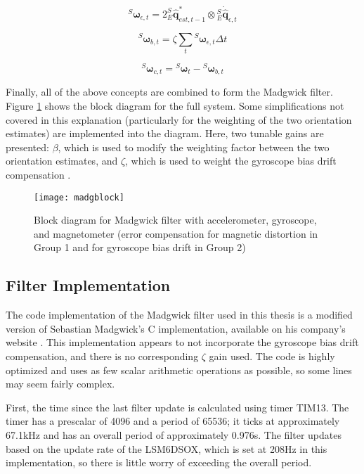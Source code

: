 \documentclass[12pt,a4paper]{report}
\begin{document}
\begin{equation} \label{eq:gy1}
	{}^S\boldsymbol{\omega}_{\epsilon,t} = 2^S_E\hat{\mathbf{q}}_{est,t-1}^* \otimes {}^S_E\dot{\hat{\mathbf{q}}}_{\epsilon,t}
\end{equation}

\begin{equation} \label{eq:gy2}
	{}^S\boldsymbol{\omega}_{b,t} = \zeta \sum_t {}^S\boldsymbol{\omega}_{\epsilon,t} \Delta t
\end{equation}

\begin{equation} \label{eq:gy3}
	{}^S\boldsymbol{\omega}_{c,t} = {}^S\boldsymbol{\omega}_t - {}^S\boldsymbol{\omega}_{b,t}
\end{equation}

Finally, all of the above concepts are combined to form the Madgwick filter. Figure \ref{fig:madgblock} shows the block diagram for the full system. Some simplifications not covered in this explanation (particularly for the weighting of the two orientation estimates) are implemented into the diagram. Here, two tunable gains are presented: \(\beta\), which is used to modify the weighting factor between the two orientation estimates, and \(\zeta\), which is used to weight the gyroscope bias drift compensation \cite{madgwick}.

\begin{figure}[htbp]
	\centering
	\texttt{[image: madgblock]}
	\caption{Block diagram for Madgwick filter with accelerometer, gyroscope, and magnetometer (error compensation for magnetic distortion in Group 1 and for gyroscope bias drift in Group 2) \cite{madgwick}}
	\label{fig:madgblock}
\end{figure}

\subsection{Filter Implementation} \label{ssec:4s4s3}
The code implementation of the Madgwick filter used in this thesis is a modified version of Sebastian Madgwick’s C implementation, available on his company’s website \cite{xiotech}. This implementation appears to not incorporate the gyroscope bias drift compensation, and there is no corresponding \(\zeta\) gain used. The code is highly optimized and uses as few scalar arithmetic operations as possible, so some lines may seem fairly complex.

First, the time since the last filter update is calculated using timer TIM13. The timer has a prescalar of 4096 and a period of 65536; it ticks at approximately 67.1kHz and has an overall period of approximately 0.976s. The filter updates based on the update rate of the LSM6DSOX, which is set at 208Hz in this implementation, so there is little worry of exceeding the overall period.
\end{document}
